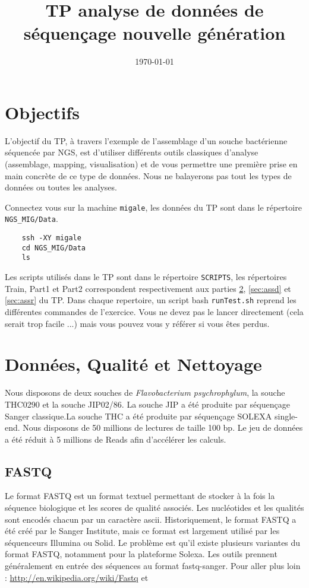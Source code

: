 \documentclass[a4paper,12pt]{article}
\title{TP analyse de données de séquençage nouvelle génération}
\date{\today}
\begin{document}
 

\maketitle 
\section{Objectifs} 
L'objectif du TP, à travers l'exemple de l'assemblage d'un souche bactérienne séquencée par NGS, est d'utiliser différents outils classiques d'analyse (assemblage, mapping, visualisation) et de vous permettre une première prise en main concrète de ce type de données. Nous ne balayerons pas tout les types de données ou toutes les analyses.

Connectez vous sur la machine \verb=migale=, les données du TP sont dans le répertoire \verb=NGS_MIG/Data=.
\begin{lstlisting}
	ssh -XY migale
	cd NGS_MIG/Data
	ls
\end{lstlisting}



Les scripts utilisés dans le TP sont dans le répertoire \verb=SCRIPTS=, les répertoires Train, Part1 et Part2 correspondent respectivement aux parties \ref{sec:qual}, \ref{sec:assd} et \ref{sec:assr} du TP. Dans chaque repertoire, un script bash \verb=runTest.sh= reprend les différentes commandes de l'exercice. Vous ne devez pas le lancer directement (cela serait trop facile ...) mais vous pouvez vous y référer si vous êtes perdus. 

\section{Données, Qualité et Nettoyage}
\label{sec:qual}
Nous disposons de deux souches de \textit{Flavobacterium psychrophylum}, la souche THC0290 et la souche JIP02/86. La souche JIP a été produite par séquençage Sanger classique.La souche THC a été produite par séquençage SOLEXA single-end. Nous disposons de 50 millions de lectures de taille 100 bp. Le jeu de données a été réduit à 5 millions de Reads afin d'accélérer les calculs.

\subsection{FASTQ}
\label{sec:fastq}
Le format FASTQ est un format textuel permettant de stocker à la fois la séquence biologique et les scores de qualité associés. Les nucléotides et les qualités sont encodés chacun par un caractère ascii. Historiquement, le format FASTQ a été créé par le Sanger Institute, mais ce format est largement utilisé par les séquenceurs Illumina ou Solid. Le problème est qu'il existe plusieurs variantes du format FASTQ, notamment pour la plateforme Solexa. Les outils prennent généralement en entrée des séquences au format fastq-sanger.
Pour aller plus loin : \url{http://en.wikipedia.org/wiki/Fastq} et \cite{Cock:2009p1945} 
\end{document}
